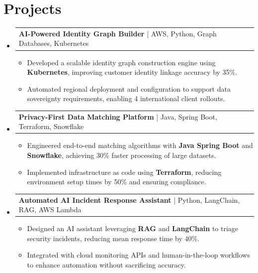 \documentclass[letterpaper,11pt]{article}
\makeatletter
\newcommand{\resumeItem}[1]{
  \item\footnotesize{
    {#1 \vspace{-2pt}}
  }
}
\newcommand{\resumeProjectHeading}[2]{
    \item
    \begin{tabular*}{1.001\textwidth}{l@{\extracolsep{\fill}}r}
      \small#1 & \textbf{\small #2}\\
    \end{tabular*}\vspace{-7pt}
}
\newcommand{\resumeSubHeadingListStart}{\begin{itemize}[leftmargin=0pt, label={}]}
\newcommand{\resumeSubHeadingListEnd}{\end{itemize}}
\newcommand{\resumeItemListStart}{\begin{itemize}[leftmargin=*]}
\newcommand{\resumeItemListEnd}{\end{itemize}\vspace{-5pt}}
\makeatother
\begin{document}
\section{Projects}
    \vspace{-5pt}
    \resumeSubHeadingListStart
          \resumeProjectHeading
              {\textbf{AI-Powered Identity Graph Builder} | AWS, Python, Graph Databases, Kubernetes}{}
        \resumeItemListStart
            \resumeItem{Developed a scalable identity graph construction engine using \textbf{Kubernetes}, improving customer identity linkage accuracy by 35\%.}
            \resumeItem{Automated regional deployment and configuration to support data sovereignty requirements, enabling 4 international client rollouts.}
        \resumeItemListEnd
        \vspace{-12pt}

    \resumeProjectHeading
        {\textbf{Privacy-First Data Matching Platform} | Java, Spring Boot, Terraform, Snowflake}{}
        \resumeItemListStart
            \resumeItem{Engineered end-to-end matching algorithms with \textbf{Java Spring Boot} and \textbf{Snowflake}, achieving 30\% faster processing of large datasets.}
            \resumeItem{Implemented infrastructure as code using \textbf{Terraform}, reducing environment setup times by 50\% and ensuring compliance.}
        \resumeItemListEnd
        \vspace{-12pt}

      \resumeProjectHeading
          {\textbf{Automated AI Incident Response Assistant} | Python, LangChain, RAG, AWS Lambda}{}
          \resumeItemListStart
              \resumeItem{Designed an AI assistant leveraging \textbf{RAG} and \textbf{LangChain} to triage security incidents, reducing mean response time by 40\%.}
              \resumeItem{Integrated with cloud monitoring APIs and human-in-the-loop workflows to enhance automation without sacrificing accuracy.}
          \resumeItemListEnd 
    \resumeSubHeadingListEnd
\end{document}
